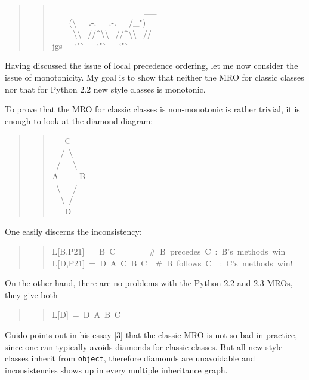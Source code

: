 \documentclass[10pt,a4paper,english]{article}
\begin{document}
\begin{quote}
\begin{quote}{\ttfamily \raggedright \noindent
~~~~~~~~~~~~~~~~~~~~~~{\_}{\_}~\\
~~~~({\textbackslash}~~~.-.~~~.-.~~~/{\_}")~\\
~~~~~{\textbackslash}{\textbackslash}{\_}//{\textasciicircum}{\textbackslash}{\textbackslash}{\_}//{\textasciicircum}{\textbackslash}{\textbackslash}{\_}//~\\
jgs~~~`"`~~~`"`~~~`"`
}\end{quote}
\end{quote}

Having discussed the issue of local precedence ordering, let me now
consider the issue of monotonicity.  My goal is to show that neither the
MRO for classic classes nor that for Python 2.2 new style classes is
monotonic.

To prove that the MRO for classic classes is non-monotonic is rather
trivial, it is enough to look at the diamond diagram:
\begin{quote}
\begin{quote}{\ttfamily \raggedright \noindent
~~~C~\\
~~/~{\textbackslash}~\\
~/~~~{\textbackslash}~\\
A~~~~~B~\\
~{\textbackslash}~~~/~\\
~~{\textbackslash}~/~\\
~~~D
}\end{quote}
\end{quote}

One easily discerns the inconsistency:
\begin{quote}
\begin{quote}{\ttfamily \raggedright \noindent
L{[}B,P21]~=~B~C~~~~~~~~{\#}~B~precedes~C~:~B's~methods~win~\\
L{[}D,P21]~=~D~A~C~B~C~~{\#}~B~follows~C~~:~C's~methods~win!
}\end{quote}
\end{quote}

On the other hand, there are no problems with the Python 2.2 and 2.3
MROs, they give both
\begin{quote}
\begin{quote}{\ttfamily \raggedright \noindent
L{[}D]~=~D~A~B~C
}\end{quote}
\end{quote}

Guido points out in his essay [\hyperlink{id6}{3}] that the classic MRO is not so bad in
practice, since one can typically avoids diamonds for classic classes.
But all new style classes inherit from \texttt{object}, therefore diamonds are
unavoidable and inconsistencies shows up in every multiple inheritance
graph.
\end{document}
